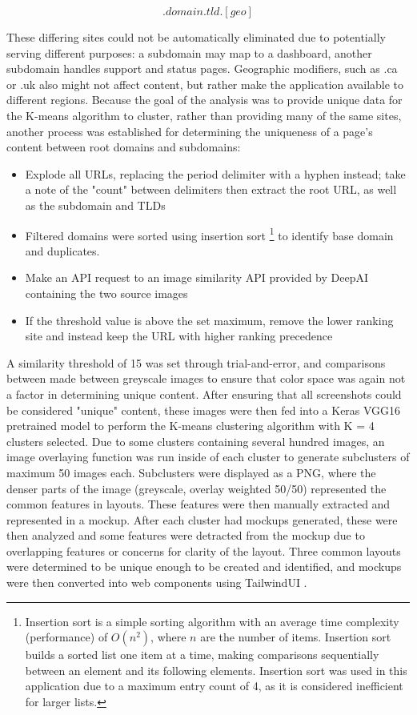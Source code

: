 \documentclass[conference]{IEEEtran}
\begin{document}
\begin{equation}
    [subdomain].domain.tld.[geo]
\end{equation}


These differing sites could not be automatically eliminated due to potentially serving different purposes: a subdomain may map to a dashboard, another subdomain handles support and status pages. Geographic modifiers, such as .ca or .uk also might not affect content, but rather make the application available to different regions. Because the goal of the analysis was to provide unique data for the K-means algorithm to cluster, rather than providing many of the same sites, another process was established for determining the uniqueness of a page's content between root domains and subdomains:

\renewcommand{\labelitemi}{$\textendash$}
\begin{itemize}
\item Explode all URLs, replacing the period delimiter with a hyphen instead; take a note of the "count" between delimiters then extract the root URL, as well as the subdomain and TLDs
\item Filtered domains were sorted using insertion sort \footnote{Insertion sort is a simple sorting algorithm with an average time complexity (performance) of $O(n^2)$, where \(n\) are the number of items. Insertion sort builds a sorted list one item at a time, making comparisons sequentially between an element and its following elements. Insertion sort was used in this application due to a maximum entry count of 4, as it is considered inefficient for larger lists.} to identify base domain and duplicates.
\item Make an API request to an image similarity API provided by DeepAI \cite{deepai} containing the two source images
\item If the threshold value is above the set maximum, remove the lower ranking site and instead keep the URL with higher ranking precedence
\end{itemize}

A similarity threshold of 15 was set through trial-and-error, and comparisons between made between greyscale images to ensure that color space was again not a factor in determining unique content. After ensuring that all screenshots could be considered "unique" content, these images were then fed into a Keras VGG16 pretrained model \cite{simonyan2014deep} to perform the K-means clustering algorithm with K = 4 clusters selected. Due to some clusters containing several hundred images, an image overlaying function was run inside of each cluster to generate subclusters of maximum 50 images each. Subclusters were displayed as a PNG, where the denser parts of the image (greyscale, overlay weighted 50/50) represented the common features in layouts. These features were then manually extracted and represented in a mockup. After each cluster had mockups generated, these were then analyzed and some features were detracted from the mockup due to overlapping features or concerns for clarity of the layout. Three common layouts were determined to be unique enough to be created and identified, and mockups were then converted into web components using TailwindUI \cite{tailwindui}.
\end{document}
